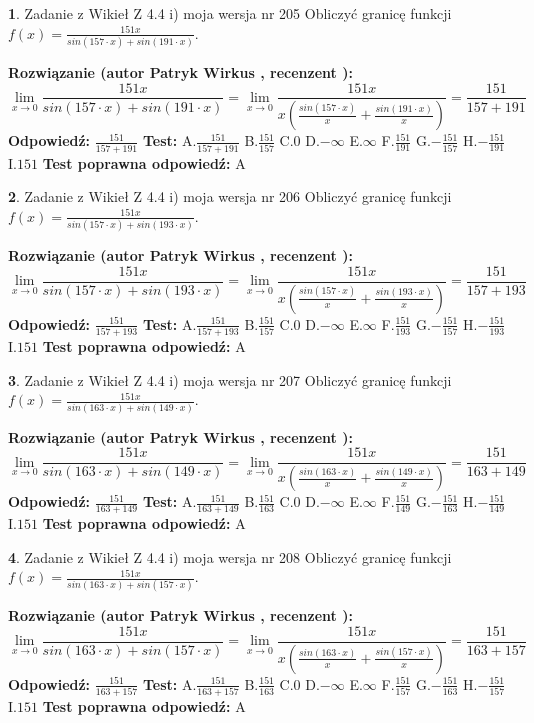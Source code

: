 \documentclass[12pt, a4paper]{article}
\theoremstyle{definition} %
\newtheorem{zad}{}
\newcommand{\zadStart}[1]{\begin{zad}#1\newline}
\newcommand{\zadStop}{\end{zad}}
\newcommand{\rozwStart}[2]{\noindent \textbf{Rozwiązanie (autor #1 , recenzent #2): }\newline}
\newcommand{\rozwStop}{\newline}
\newcommand{\odpStart}{\noindent \textbf{Odpowiedź:}\newline}
\newcommand{\odpStop}{\newline}
\newcommand{\testStart}{\noindent \textbf{Test:}\newline}
\newcommand{\testStop}{\newline}
\newcommand{\kluczStart}{\noindent \textbf{Test poprawna odpowiedź:}\newline}
\newcommand{\kluczStop}{\newline}
\begin{document}
\zadStart{Zadanie z Wikieł Z 4.4 i) moja wersja nr 205}
Obliczyć granicę funkcji $f(x)=\frac{151x}{sin(157\cdot x) +sin(191\cdot x)}$.
\zadStop
\rozwStart{Patryk Wirkus}{}
$$\lim\limits_{x\to 0}\frac{151x}{sin(157\cdot x) +sin(191\cdot x)}=\lim\limits_{x\to 0}\frac{151x}{x(\frac{sin(157\cdot x)}{x}+\frac{sin(191\cdot x)}{x})}=\frac{151}{157+191}$$
\rozwStop
\odpStart
$\frac{151}{157+191}$
\odpStop
\testStart
A.$\frac{151}{157+191}$
B.$\frac{151}{157}$
C.$0$
D.$-\infty$
E.$\infty$
F.$\frac{151}{191}$
G.$-\frac{151}{157}$
H.$-\frac{151}{191}$
I.$151$
\testStop
\kluczStart
A
\kluczStop



\zadStart{Zadanie z Wikieł Z 4.4 i) moja wersja nr 206}
Obliczyć granicę funkcji $f(x)=\frac{151x}{sin(157\cdot x) +sin(193\cdot x)}$.
\zadStop
\rozwStart{Patryk Wirkus}{}
$$\lim\limits_{x\to 0}\frac{151x}{sin(157\cdot x) +sin(193\cdot x)}=\lim\limits_{x\to 0}\frac{151x}{x(\frac{sin(157\cdot x)}{x}+\frac{sin(193\cdot x)}{x})}=\frac{151}{157+193}$$
\rozwStop
\odpStart
$\frac{151}{157+193}$
\odpStop
\testStart
A.$\frac{151}{157+193}$
B.$\frac{151}{157}$
C.$0$
D.$-\infty$
E.$\infty$
F.$\frac{151}{193}$
G.$-\frac{151}{157}$
H.$-\frac{151}{193}$
I.$151$
\testStop
\kluczStart
A
\kluczStop



\zadStart{Zadanie z Wikieł Z 4.4 i) moja wersja nr 207}
Obliczyć granicę funkcji $f(x)=\frac{151x}{sin(163\cdot x) +sin(149\cdot x)}$.
\zadStop
\rozwStart{Patryk Wirkus}{}
$$\lim\limits_{x\to 0}\frac{151x}{sin(163\cdot x) +sin(149\cdot x)}=\lim\limits_{x\to 0}\frac{151x}{x(\frac{sin(163\cdot x)}{x}+\frac{sin(149\cdot x)}{x})}=\frac{151}{163+149}$$
\rozwStop
\odpStart
$\frac{151}{163+149}$
\odpStop
\testStart
A.$\frac{151}{163+149}$
B.$\frac{151}{163}$
C.$0$
D.$-\infty$
E.$\infty$
F.$\frac{151}{149}$
G.$-\frac{151}{163}$
H.$-\frac{151}{149}$
I.$151$
\testStop
\kluczStart
A
\kluczStop



\zadStart{Zadanie z Wikieł Z 4.4 i) moja wersja nr 208}
Obliczyć granicę funkcji $f(x)=\frac{151x}{sin(163\cdot x) +sin(157\cdot x)}$.
\zadStop
\rozwStart{Patryk Wirkus}{}
$$\lim\limits_{x\to 0}\frac{151x}{sin(163\cdot x) +sin(157\cdot x)}=\lim\limits_{x\to 0}\frac{151x}{x(\frac{sin(163\cdot x)}{x}+\frac{sin(157\cdot x)}{x})}=\frac{151}{163+157}$$
\rozwStop
\odpStart
$\frac{151}{163+157}$
\odpStop
\testStart
A.$\frac{151}{163+157}$
B.$\frac{151}{163}$
C.$0$
D.$-\infty$
E.$\infty$
F.$\frac{151}{157}$
G.$-\frac{151}{163}$
H.$-\frac{151}{157}$
I.$151$
\testStop
\kluczStart
A
\kluczStop
\end{document}
